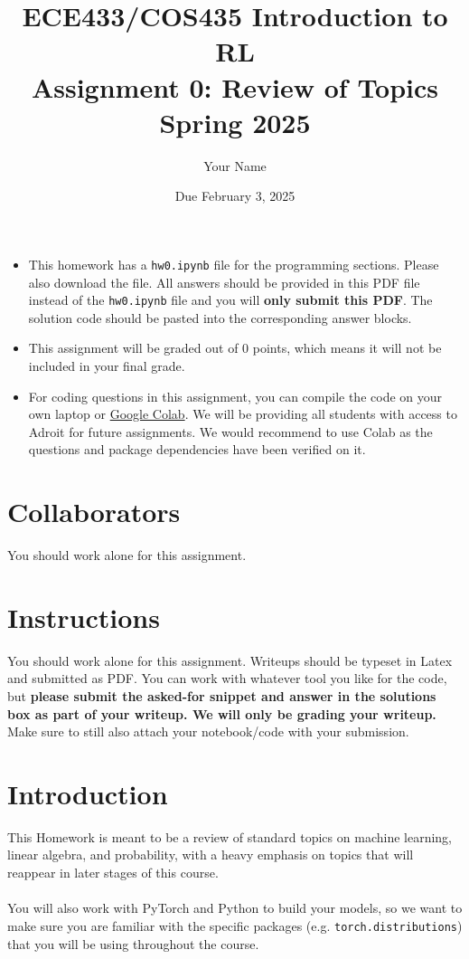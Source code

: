 \documentclass[12pt]{article}
\title{ECE433/COS435 Introduction to RL\\
  Assignment 0: Review of Topics\\
  Spring 2025\\
}
\date{Due February 3, 2025}
\author{\begin{fillme}[width=0.3\textwidth]
Your Name
\end{fillme}} %
\begin{document}
\maketitle
\noindent

\begin{itemize}
    \item This homework has a \texttt{hw0.ipynb} file for the programming sections. Please also download the file. All answers should be provided in this PDF file instead of the \texttt{hw0.ipynb} file and you will \textbf{only submit this PDF}. The solution code should be pasted into the corresponding answer blocks.
    \item This assignment will be graded out of 0 points, which means it will not be included in your final grade.
    \item For coding questions in this assignment, you can compile the code on your own laptop or \href{https://colab.research.google.com/}{Google Colab}. We will be providing all students with access to Adroit for future assignments. We would recommend to use Colab as the questions and package dependencies have been verified on it.
\end{itemize}

\newpage
\section*{Collaborators}
\begin{fillme}
You should work alone for this assignment.
\end{fillme}

\section*{Instructions}

You should work alone for this assignment. Writeups should be typeset in Latex and submitted as PDF. You can work with whatever tool you like for the code, but \textbf{please submit the asked-for snippet and answer in the solutions box as part of your writeup. We will only be grading your writeup.} Make sure to still also attach your notebook/code with your submission.

\section*{Introduction}
This Homework is meant to be a review of standard topics on machine learning, linear algebra, and probability, with a heavy emphasis on topics that will reappear in later stages of this course. 
\\\\
You will also work with PyTorch and Python to build your models, so we want to make sure you are familiar with the specific packages (e.g. \texttt{torch.distributions}) that you will be using throughout the course.
\newpage
\end{document}
